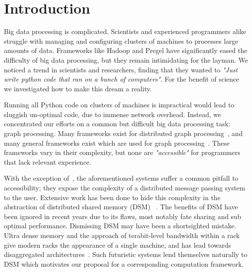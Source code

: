 \section{Introduction}
\label{sec:intro}

Big data processing is complicated. Scientists and experienced 
programmers alike struggle with managing and configuring
clusters of machines to processes large amounts of data. Frameworks
like Hadoop and Pregel have significantly eased the difficulty of big
data processing, but they remain intimidating for the layman. We
noticed a trend in scientists and researchers, finding that they
wanted to \textit{"Just write python code that ran on a bunch of
computers"}. For the benefit of science we investigated how to make
this dream a reality.

Running all Python code on clusters of machines is impractical would lead to sluggish un-optimal code, due to immense network overhead. Instead,
we concentrated our efforts on a common but difficult big data
processing task: graph processing. Many frameworks exist for
distributed graph
processing~\cite{Malewicz:2010:PSL:1807167.1807184,Ching:2015:OTE:2824032.2824077,Kyrola:2012:GLG:2387880.2387884,Low:2012:DGF:2212351.2212354,Xin:2013:GRD:2484425.2484427,Gonzalez:2012:PDG:2387880.2387883},
and many general frameworks exist which are used for graph
processing~\cite{Vavilapalli:2013:AHY:2523616.2523633,Zaharia:2012:RDD:2228298.2228301,Isard:2007:DDD:1272996.1273005,Murray:2013:NTD:2517349.2522738}.
These frameworks vary in their complexity, but none are
\textit{"accessible"} for programmers that lack relevant experience.

With the exception of~\cite{Kyrola:2012:GLG:2387880.2387884}, the
aforementioned systems suffer a common pitfall to accessibility; they
expose the complexity of a distributed message passing system to the
user. Extensive work has been done to hide this complexity in the
abstraction of distributed shared memory (DSM)
~\cite{Keleher:1994:TDS:1267074.1267084,Power:2010:PBF:1924943.1924964,Morin:2004:KDP:1111682.1111729,Haddad:2001:MCL:374794.374800,Huang06vodca:view-oriented}.
The benefits of DSM have been ignored in recent years due to its flaws,
most notably fate sharing and sub optimal performance. Dismissing DSM may 
have been a shortsighted mistake. Ultra dense memory and the
approach of terabit-level bandwidth within a rack give modern racks the
appearance of a single machine, and has lead towards disaggregated
architectures~\cite{facebook-rack,machine,intel-rsa,seamicro,Han:2013:NSR:2535771.2535778}.
Such futuristic systems lend themselves naturally to DSM which
motivates our proposal for a corresponding computation framework.

